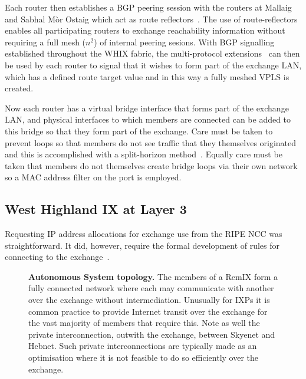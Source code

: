 Each router then establishes a \ac{BGP} peering session with the
routers at Mallaig and Sabhal M\`{o}r Ostaig which act as route
reflectors~\cite{rfc4456}. The use of route-reflectors enables all
participating routers to exchange reachability information without
requiring a full mesh ($n^2$) of internal peering
sesions. With \ac{BGP} signalling established throughout the \ac{WHIX}
fabric,  the multi-protocol extensions~\cite{rfc4760} can then be used
by each router to signal that it wishes to form part of the
exchange \ac{LAN}, which has a defined route target value and in this
way a fully meshed \ac{VPLS} is created.

Now each router has a virtual bridge interface that forms part of the
exchange \ac{LAN}, and physical interfaces to which members are
connected can be added to this bridge so that they form part of the
exchange. Care must be taken to prevent loops so that members do not
see traffic that they themselves originated and this is accomplished
with a split-horizon method~\cite{rfc4762}. Equally care must be taken
that members do not themselves create bridge loops via their own
network so a \ac{MAC} address filter on the port is employed.

\subsection{West Highland IX at Layer 3}
Requesting IP address allocations for exchange use from the RIPE NCC
was straightforward. It did, however, require the formal development
of rules for connecting to the exchange~\cite{whixrules}.

\begin{figure}[h]
  \resizebox{\linewidth}{!}{
    \begin{tikzpicture}
      \whixtopodiagram
    \end{tikzpicture}
  }
  \caption{
  \textbf{Autonomous System topology.} The members of a RemIX form a fully connected network where each may communicate
  with another over the exchange without intermediation. Unusually for \acp{IXP} it is common practice to provide Internet transit over the exchange for the vast majority of members that require this. Note as
  well the private interconnection, outwith the exchange, between Skyenet
  and Hebnet. Such private interconnections are typically made as
  an optimisation where it is not feasible to do so efficiently over the exchange.
  }
\end{figure}
